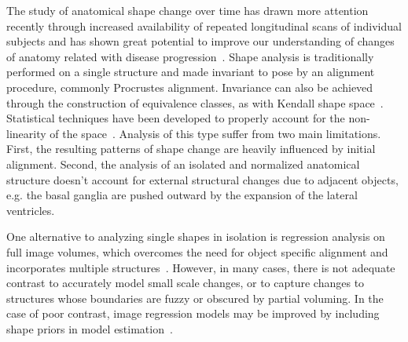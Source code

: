 \documentclass{llncs}
\begin{document}
The study of anatomical shape change over time has drawn more attention recently through increased availability of repeated longitudinal scans of individual subjects and has shown great potential to improve our understanding of changes of anatomy related with disease progression~\cite{Gerig2016}. %
Shape analysis is traditionally performed on a single structure and made invariant to pose by an alignment procedure, commonly Procrustes alignment. Invariance can also be achieved through the construction of equivalence classes, as with Kendall shape space~\cite{kendall84BLMS}. Statistical techniques have been developed to properly account for the non-linearity of the space~\cite{journals/ijcv/Fletcher13, fletcher2004principal}. Analysis of this type suffer from two main limitations. First, the resulting patterns of shape change are heavily influenced by initial alignment. Second, the analysis of an isolated and normalized anatomical structure doesn't account for external structural changes due to adjacent objects, e.g. the basal ganglia are pushed outward by the expansion of the lateral ventricles. 

One alternative to analyzing single shapes in isolation is regression analysis on full image volumes, which overcomes the need for object specific alignment and incorporates multiple structures~\cite{niethammer_geodesic, singh2015splines}. However, in many cases, there is not adequate contrast to accurately model small scale changes, or to capture changes to structures whose boundaries are fuzzy or obscured by partial voluming. In the case of poor contrast, image regression models may be improved by including shape priors in model estimation~\cite{SCI:Fis2014a}.
\end{document}
